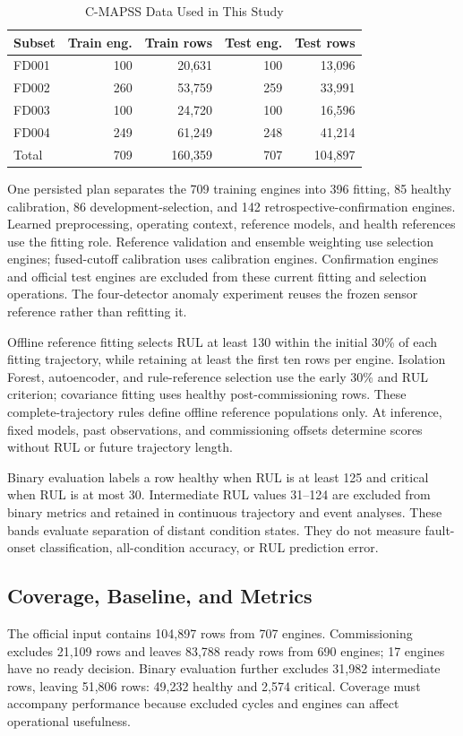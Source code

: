 \documentclass[conference]{IEEEtran}
\begin{document}
\begin{table}[t]
\caption{C-MAPSS Data Used in This Study}
\label{tab:data}
\centering
\begin{tabular}{lrrrr}
\toprule
Subset & Train eng. & Train rows & Test eng. & Test rows\\
\midrule
FD001 & 100 & 20,631 & 100 & 13,096\\
FD002 & 260 & 53,759 & 259 & 33,991\\
FD003 & 100 & 24,720 & 100 & 16,596\\
FD004 & 249 & 61,249 & 248 & 41,214\\
\midrule
Total & 709 & 160,359 & 707 & 104,897\\
\bottomrule
\end{tabular}
\end{table}

One persisted plan separates the 709 training engines into 396 fitting, 85 healthy calibration, 86 development-selection, and 142 retrospective-confirmation engines. Learned preprocessing, operating context, reference models, and health references use the fitting role. Reference validation and ensemble weighting use selection engines; fused-cutoff calibration uses calibration engines. Confirmation engines and official test engines are excluded from these current fitting and selection operations. The four-detector anomaly experiment reuses the frozen sensor reference rather than refitting it.

Offline reference fitting selects RUL at least 130 within the initial 30\% of each fitting trajectory, while retaining at least the first ten rows per engine. Isolation Forest, autoencoder, and rule-reference selection use the early 30\% and RUL criterion; covariance fitting uses healthy post-commissioning rows. These complete-trajectory rules define offline reference populations only. At inference, fixed models, past observations, and commissioning offsets determine scores without RUL or future trajectory length.

Binary evaluation labels a row healthy when RUL is at least 125 and critical when RUL is at most 30. Intermediate RUL values 31--124 are excluded from binary metrics and retained in continuous trajectory and event analyses. These bands evaluate separation of distant condition states. They do not measure fault-onset classification, all-condition accuracy, or RUL prediction error.

\subsection{Coverage, Baseline, and Metrics}
The official input contains 104,897 rows from 707 engines. Commissioning excludes 21,109 rows and leaves 83,788 ready rows from 690 engines; 17 engines have no ready decision. Binary evaluation further excludes 31,982 intermediate rows, leaving 51,806 rows: 49,232 healthy and 2,574 critical. Coverage must accompany performance because excluded cycles and engines can affect operational usefulness.
\end{document}
